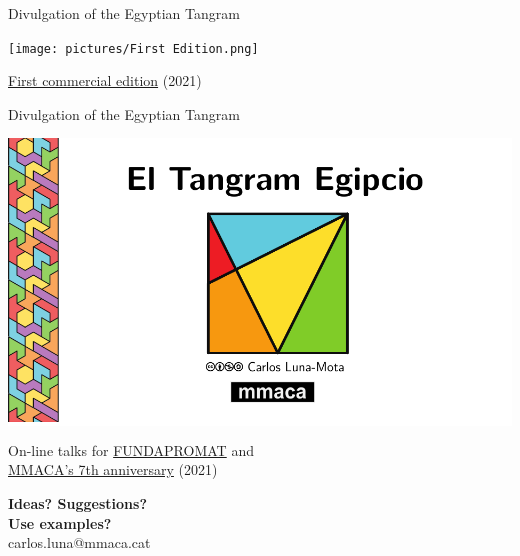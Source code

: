 \documentclass[14pt]{beamer}
\begin{document}

    \begin{frame}{Divulgation of the Egyptian Tangram}
        \begin{center}
            \texttt{[image: pictures/First Edition.png]} \\

            \smallskip

            \href{https://mmaca.cat/botiga/}{First commercial edition} (2021)
        \end{center}
    \end{frame}


    \begin{frame}{Divulgation of the Egyptian Tangram}
        \begin{center}
            \colorbox{white}{\includegraphics[height=25ex]{pictures/El Tangram Egipcio 2021 - p01.pdf}} \\\medskip

            On-line talks for \href{https://www.fundapromat.org/}{FUNDAPROMAT} and\\ \href{https://www.youtube.com/watch?v=Tf-mPWFS3ik&t=7332s}{MMACA's 7th anniversary} (2021)
        \end{center}
    \end{frame}


    \begin{frame}{}
        \begin{center}
            \textbf{\huge Ideas? Suggestions?\\[0.5ex] Use examples?}\\[4ex]
            {\Large carlos.luna@mmaca.cat}
        \end{center}
    \end{frame}
\end{document}
